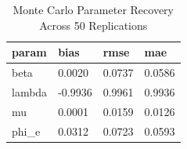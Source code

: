 \begin{table}[htbp]
\centering
\caption{Monte Carlo Parameter Recovery Across 50 Replications}
\label{tab:table_T5_parameter_recovery}
\begin{tabular}{llll}
\hline
param & bias & rmse & mae \\
\hline
beta & 0.0020 & 0.0737 & 0.0586 \\
lambda & -0.9936 & 0.9961 & 0.9936 \\
mu & 0.0001 & 0.0159 & 0.0126 \\
phi\_e & 0.0312 & 0.0723 & 0.0593 \\
\hline
\end{tabular}
\end{table}
